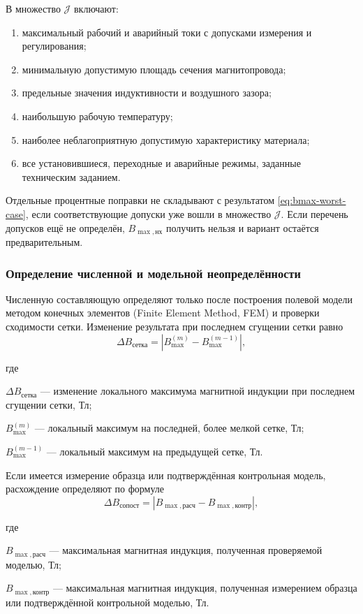 \documentclass[14pt,a4paper]{extarticle}
\newenvironment{whereblock}
 {\par\noindent где\par
  \begin{list}{}{\setlength{\leftmargin}{12.5mm}
                  \setlength{\itemindent}{-12.5mm}
                  \setlength{\itemsep}{0pt}
                  \setlength{\parsep}{0pt}
                  \setlength{\topsep}{0pt}}}
 {\end{list}}
\newcommand{\whereitem}[2]{\item[] #1 --- #2}
\begin{document}
В множество $\mathcal J$ включают:
\begin{enumerate}
\item максимальный рабочий и аварийный токи с допусками измерения и
регулирования;
\item минимальную допустимую площадь сечения магнитопровода;
\item предельные значения индуктивности и воздушного зазора;
\item наибольшую рабочую температуру;
\item наиболее неблагоприятную допустимую характеристику материала;
\item все установившиеся, переходные и аварийные режимы, заданные
техническим заданием.
\end{enumerate}

Отдельные процентные поправки не складывают с результатом
\eqref{eq:bmax-worst-case}, если соответствующие допуски уже вошли в
множество $\mathcal J$. Если перечень допусков ещё не определён,
$B_{\max,\text{нх}}$ получить нельзя и вариант остаётся предварительным.

\subsubsection{Определение численной и модельной неопределённости}

Численную составляющую определяют только после построения полевой модели
методом конечных элементов (Finite Element Method, FEM) и проверки
сходимости сетки. Изменение результата при последнем сгущении сетки равно
\begin{equation}
 \Delta B_{\text{сетка}}=
 \left|
 B_{\max}^{(m)}-
 B_{\max}^{(m-1)}
 \right|,
 \label{eq:b-mesh-uncertainty}
\end{equation}
\begin{whereblock}
\whereitem{$\Delta B_{\text{сетка}}$}{изменение локального максимума
магнитной индукции при последнем сгущении сетки, Тл;}
\whereitem{$B_{\max}^{(m)}$}{локальный максимум на последней, более
мелкой сетке, Тл;}
\whereitem{$B_{\max}^{(m-1)}$}{локальный максимум на предыдущей
сетке, Тл.}
\end{whereblock}

Если имеется измерение образца или подтверждённая контрольная модель,
расхождение определяют по формуле
\begin{equation}
 \Delta B_{\text{сопост}}=
 \left|
 B_{\max,\text{расч}}-
 B_{\max,\text{контр}}
 \right|,
 \label{eq:b-validation-uncertainty}
\end{equation}
\begin{whereblock}
\whereitem{$B_{\max,\text{расч}}$}{максимальная магнитная индукция,
полученная проверяемой моделью, Тл;}
\whereitem{$B_{\max,\text{контр}}$}{максимальная магнитная индукция,
полученная измерением образца или подтверждённой контрольной моделью,
Тл.}
\end{whereblock}
\end{document}
